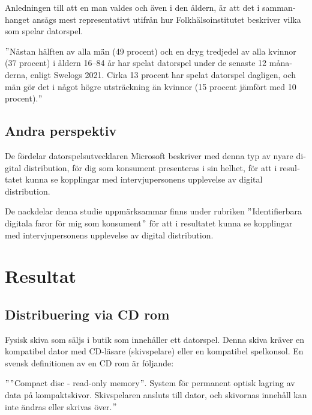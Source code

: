 \documentclass[11p]{article}
\begin{document}
\begin{otherlanguage}{swedish}
        Anledningen till att en man valdes och även i den åldern, är att det i sammanhanget ansågs mest representativt utifrån hur Folkhälsoinstitutet beskriver vilka som spelar datorspel.

        \setlength{\leftskip}{1cm}

        \("\)Nästan hälften av alla män (49 procent) och en dryg tredjedel av alla kvinnor (37 procent) i åldern 16–84 år har spelat datorspel under de senaste 12 månaderna, enligt Swelogs 2021.
        Cirka 13 procent har spelat datorspel dagligen, och män gör det i något högre utsträckning än kvinnor (15 procent jämfört med 10 procent).\("\)\parencite{folkhalsa}

        \setlength{\leftskip}{0cm}

        \subsection{Andra perspektiv}

        De fördelar datorspelsutvecklaren Microsoft beskriver med denna typ av nyare digital distribution, för dig som konsument presenteras i sin helhet, för att i resultatet kunna se kopplingar med intervjupersonens upplevelse av digital distribution.



        De nackdelar denna studie uppmärksammar finns under rubriken \("\)Identifierbara digitala faror för mig som konsument\("\)  för att i resultatet kunna se kopplingar med intervjupersonens upplevelse av digital distribution.

        \section{Resultat}

       \subsection{Distribuering via CD rom} 
        Fysisk skiva som säljs i butik som innehåller ett datorspel.
        Denna skiva kräver en kompatibel dator med CD-läsare (skivspelare)  eller en kompatibel spelkonsol.
        En svensk definitionen av en CD rom är följande:

        \setlength{\leftskip}{1cm}

        \("\)\("\)Compact disc - read-only memory\("\).
        System för permanent optisk lagring av data på kompaktskivor.
        Skivspelaren ansluts till dator, och skivornas innehåll kan inte ändras eller skrivas över.\("\) \parencite{CD}


\end{otherlanguage}
\end{document}
